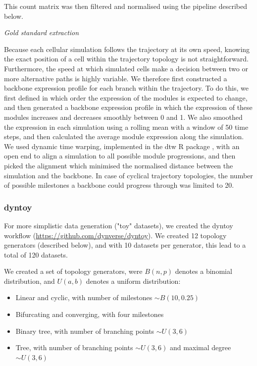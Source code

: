 This count matrix was then filtered and normalised using the pipeline described below.

\hfill\break
\textit{Gold standard extraction}
\hfill\break

Because each cellular simulation follows the trajectory at its own speed, knowing the exact position of a cell within the trajectory topology is not straightforward. Furthermore, the speed at  which simulated cells make a decision between two or more alternative paths is highly variable. We therefore first constructed a backbone expression profile for each branch within the trajectory. To do this, we first defined in which order the expression of the modules is expected to change, and then generated a backbone expression profile in which the expression of these modules increases and decreases smoothly between 0 and 1.  We also smoothed the expression in each simulation using a rolling mean with a window of 50 time steps, and then calculated the average module expression along the simulation.  We used dynamic time warping, implemented in the dtw R package \cite{giorgino_computingvisualizingdynamic_2009,tormene_matchingincompletetime_2009}, with an open end to align a simulation to all possible module progressions, and then picked the alignment which minimised the normalised distance between the simulation and the backbone. In case of cyclical trajectory topologies, the number of possible milestones a backbone could progress through was limited to 20.

\subsubsection{dyntoy}

For more simplistic data generation ("toy" datasets), we created the dyntoy workflow (\url{https://github.com/dynverse/dyntoy}). We created 12 topology generators (described below), and with 10 datasets per generator, this lead to a total of 120 datasets.

We created a set of topology generators, were $B(n, p)$ denotes a binomial distribution, and $U(a, b)$ denotes a uniform distribution:

\begin{itemize}
	\item Linear and cyclic, with number of milestones $\sim B(10, 0.25)$
	\item Bifurcating and converging, with four milestones
	\item Binary tree, with number of branching points $\sim U(3, 6)$
	\item Tree, with number of branching points $\sim U(3, 6)$ and maximal degree $\sim U(3, 6)$
\end{itemize} 

